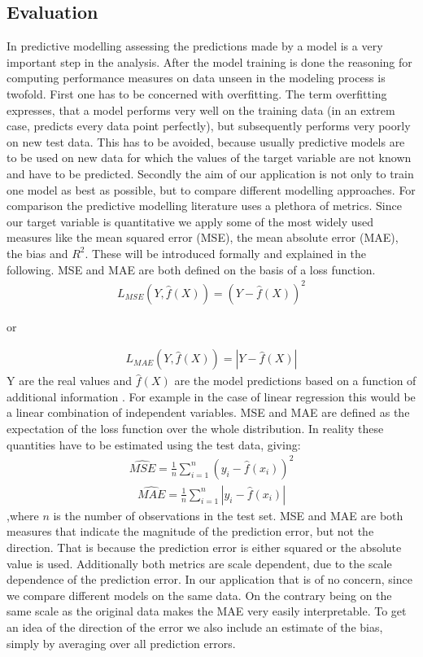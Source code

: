 \subsection{Evaluation}\label{sec:Evaluation_Theory}
In predictive modelling assessing the predictions made by a model is a very important step in the analysis. After the model training is done the reasoning for computing performance measures on data unseen in the modeling process is twofold. First one has to be concerned with overfitting. The term overfitting expresses, that a model performs very well on the training data (in an extrem case, predicts every data point perfectly), but subsequently performs very poorly on new test data. This has to be avoided, because usually predictive models are to be used on new data for which the values of the target variable are not known and have to be predicted. Secondly the aim of our application is not only to train one model as best as possible, but to compare different modelling approaches. For comparison the predictive modelling literature uses a plethora of metrics. Since our target variable is quantitative we apply some of the most widely used measures like the mean squared error (MSE), the mean absolute error (MAE), the bias and $R^2$. These will be introduced formally and explained in the following. MSE and MAE are both defined on the basis of a loss function. 
\begin{align}
L_{MSE}(Y,\hat{f}(X))=(Y-\hat{f}(X))^2
\end{align}
\begin{center}
or
\end{center}
\begin{align*}
L_{MAE}(Y,\hat{f}(X))=|Y-\hat{f}(X)|
\end{align*}
Y are the real values and $\hat{f}(X)$ are the model predictions based on a function of additional information \citep[see][pp. 219-220]{friedman_elements_2001}. For example in the case of linear regression this would be a linear combination of independent variables. MSE and MAE are defined as the expectation of the loss function over the whole distribution. In reality these quantities have to be estimated using the test data, giving:
\begin{align}
\hat{MSE}=\frac{1}{n}\sum_{i=1}^n(y_i-\hat{f}(x_i))^2
\end{align}
\begin{align}
\hat{MAE}=\frac{1}{n}\sum_{i=1}^n|y_i-\hat{f}(x_i)|
\end{align}
,where $n$ is the number of observations in the test set. MSE and MAE are both measures that indicate the magnitude of the prediction error, but not the direction. That is because the prediction error is either squared or the absolute value is used. Additionally both metrics are scale dependent, due to the scale dependence of the prediction error. In our application that is of no concern, since we compare different models on the same data. On the contrary being on the same scale as the original data makes the MAE very easily interpretable. To get an idea of the direction of the error we also include an estimate of the bias, simply by averaging over all prediction errors.
